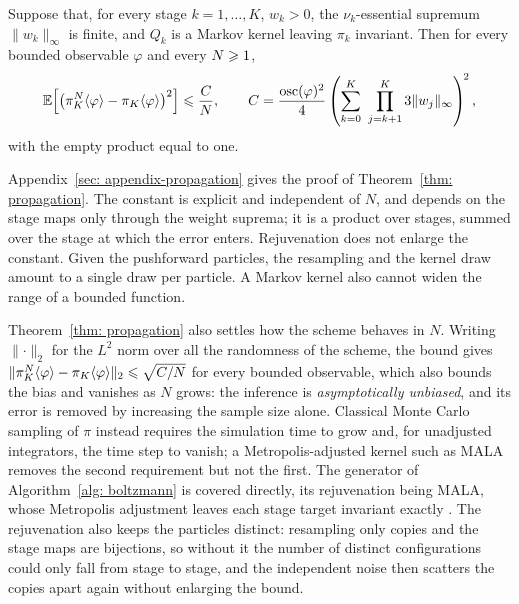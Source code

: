 \documentclass{article}
\begin{document}
\begin{theorem}
\label{thm: propagation}
Suppose that, for every stage $k=1,\dots,K$, $w_k>0$, the $\nu_k$-essential supremum $\lVert w_k \rVert_\infty$ is finite{\color{purple}, and $Q_k$ is a Markov kernel leaving $\pi_k$ invariant}. Then for every bounded observable $\varphi$ and every $N \geqslant 1$,
\begin{equation}
    \mathbb E\Bigl[\bigl(\pi_K^N\langle \varphi\rangle - \pi_K\langle \varphi\rangle\bigr)^{2}\Bigr]
    \leqslant \frac{C}{N},
    \qquad
    C = \frac{\operatorname{osc}(\varphi)^{2}}{4}
    \left(\sum_{k=0}^{K}\ \prod_{j=k+1}^{K} 3\lVert w_j \rVert_\infty\right)^{\!2},
    \label{eq: propagation-bound}
\end{equation}
with the empty product equal to one.
\end{theorem}
\noindent
Appendix~\ref{sec: appendix-propagation} gives the proof of Theorem~\ref{thm: propagation}. The constant is explicit and independent of $N$, and depends on the stage maps only through the weight suprema; it is a product over stages, summed over the stage at which the error enters. {\color{purple}Rejuvenation does not enlarge the constant. Given the pushforward particles, the resampling and the kernel draw amount to a single draw per particle. A Markov kernel also cannot widen the range of a bounded function.}

Theorem~\ref{thm: propagation} also settles how the scheme behaves in $N$. {\color{blue}Writing $\lVert\cdot\rVert_2$ for the $L^2$ norm over all the randomness of the scheme,} the bound gives $\lVert \pi_K^N\langle \varphi\rangle - \pi_K\langle \varphi\rangle \rVert_2 \leqslant \sqrt{C/N}$ for every bounded observable, which also bounds the bias and vanishes as $N$ grows: the inference is \emph{asymptotically unbiased}, and its error is removed by increasing the sample size alone. Classical Monte Carlo sampling of $\pi$ instead requires the simulation time to grow and, for unadjusted integrators, the time step to vanish; a Metropolis-adjusted kernel such as MALA removes the second requirement but not the first. {\color{purple}The generator of Algorithm~\ref{alg: boltzmann} is covered directly, its rejuvenation being MALA, whose Metropolis adjustment leaves each stage target invariant exactly} \citep{metropolis1953equation,hastings1970monte,roberts1996exponential,delmoral2004feynman}. The rejuvenation also keeps the particles distinct: resampling only copies and the stage maps are bijections, so without it the number of distinct configurations could only fall from stage to stage, and the independent noise then scatters the copies apart again without enlarging the bound.
\end{document}
